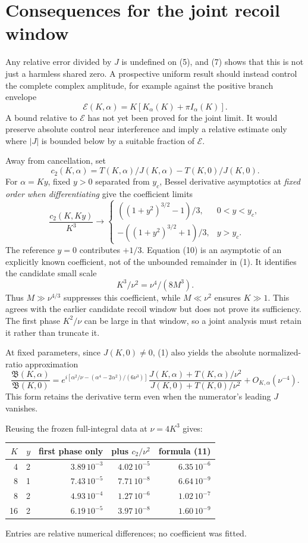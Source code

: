 \documentclass[11pt,a4paper]{article}
\begin{document}
\newpage
\section{Consequences for the joint recoil window}
Any relative error divided by \(J\) is undefined on (5), and (7)
shows that this is not just a harmless shared zero. A prospective
uniform result should instead control the complete complex amplitude,
for example against the positive branch envelope
\[
 \mathcal E(K,\alpha)=K[K_\alpha(K)+\pi I_\alpha(K)].
 \tag{9}
\]
A bound relative to \(\mathcal E\) has not yet been proved for the
joint limit. It would preserve absolute control near interference
and imply a relative estimate only where \(|J|\) is bounded below
by a suitable fraction of \(\mathcal E\).

Away from cancellation, set
\[
 c_2(K,\alpha)=T(K,\alpha)/J(K,\alpha)-T(K,0)/J(K,0).
\]
For \(\alpha=Ky\), fixed \(y>0\) separated from \(y_c\), Bessel
derivative asymptotics at \emph{fixed order when differentiating}
give the coefficient limits
\[
 \frac{c_2(K,Ky)}{K^3}\longrightarrow
 \begin{cases}
 ((1+y^2)^{3/2}-1)/3,&0<y<y_c,\\
 -((1+y^2)^{3/2}+1)/3,&y>y_c.
 \end{cases} \tag{10}
\]
The reference \(y=0\) contributes \(+1/3\).
Equation (10) is an asymptotic of an explicitly known coefficient,
not of the unbounded remainder in (1).
It identifies the candidate small scale
\[
 K^3/\nu^2=\nu^4/(8M^3).
\]
Thus \(M\gg\nu^{4/3}\) suppresses this coefficient, while
\(M\ll\nu^2\) ensures \(K\gg1\).
This agrees with the earlier candidate recoil window but does not
prove its sufficiency. The first phase \(K^2/\nu\) can be large in
that window, so a joint analysis must retain it rather than truncate it.

At fixed parameters, since \(J(K,0)\ne0\), (1) also yields the
absolute normalized-ratio approximation
\[
 \frac{\mathfrak B(K,\alpha)}{\mathfrak B(K,0)}
 =
 e^{i[\alpha^2/\nu-(\alpha^4-2\alpha^2)/(6\nu^3)]}
 \frac{J(K,\alpha)+T(K,\alpha)/\nu^2}
 {J(K,0)+T(K,0)/\nu^2}+O_{K,\alpha}(\nu^{-4}). \tag{11}
\]
This form retains the derivative term even when the numerator's
leading \(J\) vanishes.

Reusing the frozen full-integral data at \(\nu=4K^3\) gives:
\begin{center}\begin{tabular}{rrrrr}\toprule
\(K\)&\(y\)&first phase only&plus \(c_2/\nu^2\)&formula (11)\\\midrule
4&2&\(3.89\,10^{-3}\)&\(4.02\,10^{-5}\)&\(6.35\,10^{-6}\)\\
8&1&\(7.43\,10^{-5}\)&\(7.71\,10^{-8}\)&\(6.64\,10^{-9}\)\\
8&2&\(4.93\,10^{-4}\)&\(1.27\,10^{-6}\)&\(1.02\,10^{-7}\)\\
16&2&\(6.19\,10^{-5}\)&\(3.97\,10^{-8}\)&\(1.60\,10^{-9}\)\\\bottomrule
\end{tabular}\end{center}
Entries are relative numerical differences; no coefficient was fitted.
\end{document}
